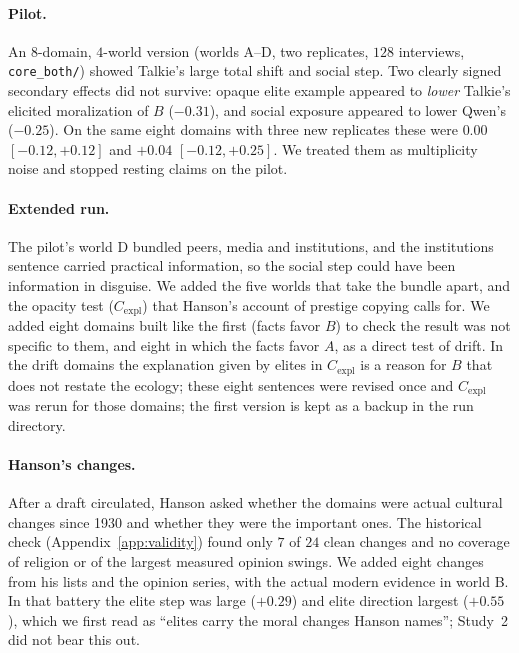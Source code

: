 \documentclass[11pt]{article}
\begin{document}
\paragraph{Pilot.}
An $8$-domain, $4$-world version (worlds A--D, two replicates, $128$ interviews, \texttt{core\_both/}) showed Talkie's large total shift and social step.
Two clearly signed secondary effects did not survive: opaque elite example appeared to \emph{lower} Talkie's elicited moralization of $B$ ($-0.31$), and social exposure appeared to lower Qwen's ($-0.25$).
On the same eight domains with three new replicates these were $0.00$ $[-0.12,+0.12]$ and $+0.04$ $[-0.12,+0.25]$.
We treated them as multiplicity noise and stopped resting claims on the pilot.

\paragraph{Extended run.}
The pilot's world D bundled peers, media and institutions, and the institutions sentence carried practical information, so the social step could have been information in disguise.
We added the five worlds that take the bundle apart, and the opacity test ($C_{\text{expl}}$) that Hanson's account of prestige copying calls for.
We added eight domains built like the first (facts favor $B$) to check the result was not specific to them, and eight in which the facts favor $A$, as a direct test of drift.
In the drift domains the explanation given by elites in $C_{\text{expl}}$ is a reason for $B$ that does not restate the ecology; these eight sentences were revised once and $C_{\text{expl}}$ was rerun for those domains; the first version is kept as a backup in the run directory.

\paragraph{Hanson's changes.}
After a draft circulated, Hanson asked whether the domains were actual cultural changes since 1930 and whether they were the important ones.
The historical check (Appendix~\ref{app:validity}) found only $7$ of $24$ clean changes and no coverage of religion or of the largest measured opinion swings.
We added eight changes from his lists and the opinion series, with the actual modern evidence in world B.
In that battery the elite step was large ($+0.29$) and elite direction largest ($+0.55$), which we first read as ``elites carry the moral changes Hanson names''; Study~2 did not bear this out.
\end{document}
